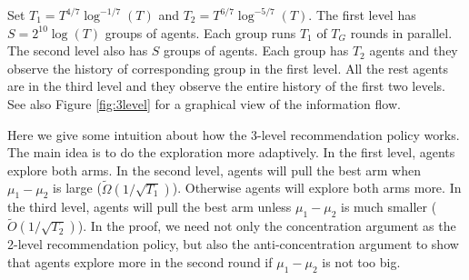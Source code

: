 Set $T_1 = T^{4/7}\log^{-1/7}(T)$ and $T_2 =
T^{6/7}\log^{-5/7}(T)$. The first level has $S = 2^{10}\log(T)$ groups
of agents. Each group runs $T_1$ \ALGG of $T_G$ rounds in
parallel. The second level also has $S$ groups of agents. Each group
has $T_2$ agents and they observe the history of corresponding group
in the first level. All the rest agents are in the third level and
they observe the entire history of the first two levels.  See also
Figure \ref{fig:3level} for a graphical view of the information flow.



Here we give some intuition about how the 3-level recommendation
policy works. The main idea is to do the exploration more
adaptively. In the first level, agents explore both arms. In the
second level, agents will pull the best arm when $\mu_1 - \mu_2$ is
large ($\tilde{\Omega}(1/\sqrt{T_1})$). Otherwise agents will explore
both arms more. In the third level, agents will pull the best arm
unless $\mu_1-\mu_2$ is much smaller ($\tilde{O}(1/\sqrt{T_2})$). In
the proof, we need not only the concentration argument as the 2-level
recommendation policy, but also the anti-concentration argument to
show that agents explore more in the second round if $\mu_1-\mu_2$ is
not too big.
\fi


